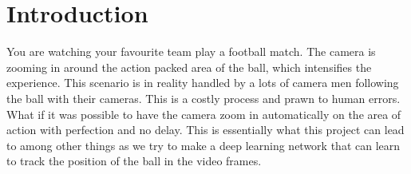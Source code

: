 
\section{Introduction}
You are watching your favourite team play a football match. The camera
is zooming in around the action packed area of the ball, which intensifies the experience.
This scenario is in reality handled by a lots of camera men
following the ball with their cameras. This is a costly process and
prawn to human errors. What if it was possible to have the camera
zoom in automatically on the area of action with perfection and
no delay. This is essentially what this project can lead to among
other things as we try to make a deep learning network that can learn to
track the position of the ball in the video frames.
